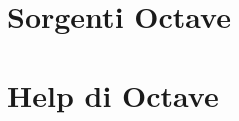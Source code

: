 \documentclass[twoside,openright,titlepage,fleqn,
	headinclude,11pt,a4paper,BCOR5mm,footinclude
	]{scrbook}
\begin{document}


\chapter{Sorgenti Octave}







\chapter*{Help di Octave}


\end{document}
